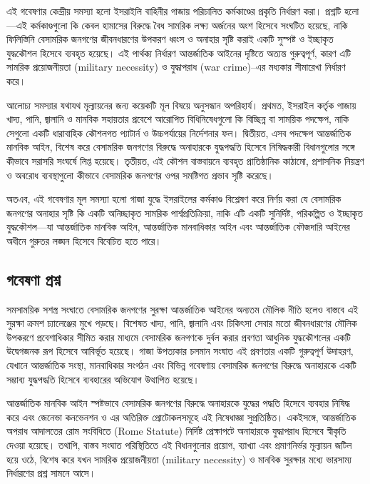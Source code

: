 এই গবেষণার কেন্দ্রীয় সমস্যা হলো ইসরাইলি বাহিনীর গাজায় পরিচালিত কর্মকাণ্ডের প্রকৃতি নির্ধারণ করা। প্রশ্নটি হলো---এই কর্মকাণ্ডগুলো কি কেবল হামাসের বিরুদ্ধে বৈধ সামরিক লক্ষ্য অর্জনের অংশ হিসেবে সংঘটিত হয়েছে, নাকি ফিলিস্তিনি বেসামরিক জনগণের জীবনধারণের উপকরণ ধ্বংস ও অনাহার সৃষ্টি করাই একটি সুস্পষ্ট ও ইচ্ছাকৃত যুদ্ধকৌশল হিসেবে ব্যবহৃত হয়েছে। এই পার্থক্য নির্ধারণ আন্তর্জাতিক আইনের দৃষ্টিতে অত্যন্ত গুরুত্বপূর্ণ, কারণ এটি সামরিক প্রয়োজনীয়তা (military necessity) ও যুদ্ধাপরাধ (war crime)--এর মধ্যকার সীমারেখা নির্ধারণ করে।

আলোচ্য সমস্যার যথাযথ মূল্যায়নের জন্য কয়েকটি মূল বিষয়ে অনুসন্ধান অপরিহার্য। প্রথমত, ইসরাইল কর্তৃক গাজায় খাদ্য, পানি, জ্বালানি ও মানবিক সহায়তার প্রবেশে আরোপিত বিধিনিষেধগুলো কি বিচ্ছিন্ন বা সাময়িক পদক্ষেপ, নাকি সেগুলো একটি ধারাবাহিক কৌশলগত প্যাটার্ন ও উচ্চপর্যায়ের নির্দেশনার ফল। দ্বিতীয়ত, এসব পদক্ষেপ আন্তর্জাতিক মানবিক আইন, বিশেষ করে বেসামরিক জনগণের বিরুদ্ধে অনাহারকে যুদ্ধপদ্ধতি হিসেবে নিষিদ্ধকারী বিধানগুলোর সঙ্গে কীভাবে সরাসরি সংঘর্ষে লিপ্ত হয়েছে। তৃতীয়ত, এই কৌশল বাস্তবায়নে ব্যবহৃত প্রাতিষ্ঠানিক কাঠামো, প্রশাসনিক নিয়ন্ত্রণ ও অবরোধ ব্যবস্থাগুলো কীভাবে বেসামরিক জনগণের ওপর সমষ্টিগত প্রভাব সৃষ্টি করেছে।

অতএব, এই গবেষণার মূল সমস্যা হলো গাজা যুদ্ধে ইসরাইলের কর্মকাণ্ড বিশ্লেষণ করে নির্ণয় করা যে বেসামরিক জনগণের অনাহার সৃষ্টি কি একটি অনিচ্ছাকৃত সামরিক পার্শ্বপ্রতিক্রিয়া, নাকি এটি একটি সুনির্দিষ্ট, পরিকল্পিত ও ইচ্ছাকৃত যুদ্ধকৌশল---যা আন্তর্জাতিক মানবিক আইন, আন্তর্জাতিক মানবাধিকার আইন এবং আন্তর্জাতিক ফৌজদারি আইনের অধীনে গুরুতর লঙ্ঘন হিসেবে বিবেচিত হতে পারে।

\subsection{\texorpdfstring{গবেষণা প্রশ্ন}{১.৩ গবেষণা প্রশ্ন}}\label{ux997ux9acux9b7ux9a3-ux9aaux9b0ux9b6ux9a8}

সমসাময়িক সশস্ত্র সংঘাতে বেসামরিক জনগণের সুরক্ষা আন্তর্জাতিক আইনের অন্যতম মৌলিক নীতি হলেও বাস্তবে এই সুরক্ষা ক্রমশ চ্যালেঞ্জের মুখে পড়ছে। বিশেষত খাদ্য, পানি, জ্বালানি এবং চিকিৎসা সেবার মতো জীবনধারণের মৌলিক উপকরণে প্রবেশাধিকার সীমিত করার মাধ্যমে বেসামরিক জনগণকে দুর্বল করার প্রবণতা আধুনিক যুদ্ধকৌশলের একটি উদ্বেগজনক রূপ হিসেবে আবির্ভূত হয়েছে। গাজা উপত্যকার চলমান সংঘাত এই প্রবণতার একটি গুরুত্বপূর্ণ উদাহরণ, যেখানে আন্তর্জাতিক সংস্থা, মানবাধিকার সংগঠন এবং বিভিন্ন গবেষণায় বেসামরিক জনগণের বিরুদ্ধে অনাহারকে একটি সম্ভাব্য যুদ্ধপদ্ধতি হিসেবে ব্যবহারের অভিযোগ উত্থাপিত হয়েছে।

আন্তর্জাতিক মানবিক আইন স্পষ্টভাবে বেসামরিক জনগণের বিরুদ্ধে অনাহারকে যুদ্ধের পদ্ধতি হিসেবে ব্যবহার নিষিদ্ধ করে এবং জেনেভা কনভেনশন ও এর অতিরিক্ত প্রোটোকলসমূহে এই নিষেধাজ্ঞা সুপ্রতিষ্ঠিত। একইসঙ্গে, আন্তর্জাতিক অপরাধ আদালতের রোম সংবিধিতে (Rome Statute) নির্দিষ্ট প্রেক্ষাপটে অনাহারকে যুদ্ধাপরাধ হিসেবে স্বীকৃতি দেওয়া হয়েছে। তথাপি, বাস্তব সংঘাত পরিস্থিতিতে এই বিধানগুলোর প্রয়োগ, ব্যাখ্যা এবং প্রমাণনির্ভর মূল্যায়ন জটিল হয়ে ওঠে, বিশেষ করে যখন সামরিক প্রয়োজনীয়তা (military necessity) ও মানবিক সুরক্ষার মধ্যে ভারসাম্য নির্ধারণের প্রশ্ন সামনে আসে।

